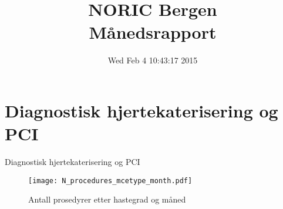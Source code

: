 \documentclass[presentation,xcolor=pdftex,dvipsnames,table]{beamer}
\title{NORIC Bergen \\Månedsrapport}\date{ Wed Feb  4 10:43:17 2015 }
\begin{document}
\maketitle



\section{Diagnostisk hjertekaterisering og PCI}

\begin{frame}
\begin{Huge}
Diagnostisk hjertekaterisering og PCI
\end{Huge}
\end{frame}




\begin{frame}
\begin{figure}
  \centering
  \caption{Antall prosedyrer etter hastegrad og måned}
\texttt{[image: N\_procedures\_mcetype\_month.pdf]}
\end{figure}\end{frame}
\end{document}
